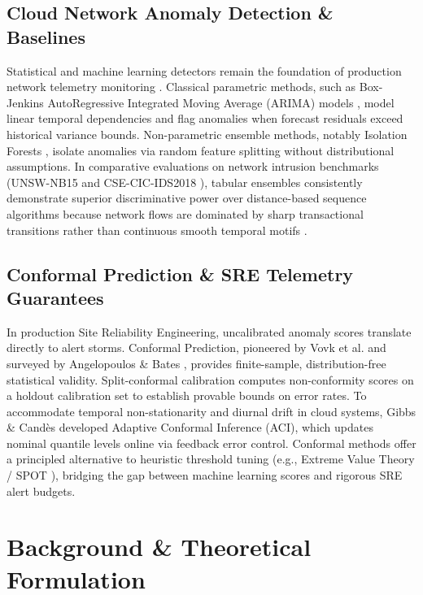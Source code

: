 \documentclass[10pt,twocolumn]{article}
\begin{document}
\subsection{Cloud Network Anomaly Detection \& Baselines}
Statistical and machine learning detectors remain the foundation of production network telemetry monitoring \cite{chandola2009anomaly}. Classical parametric methods, such as Box-Jenkins AutoRegressive Integrated Moving Average (ARIMA) models \cite{box2015time}, model linear temporal dependencies and flag anomalies when forecast residuals exceed historical variance bounds. Non-parametric ensemble methods, notably Isolation Forests \cite{liu2008isolation}, isolate anomalies via random feature splitting without distributional assumptions. In comparative evaluations on network intrusion benchmarks (UNSW-NB15 \cite{moustafa2015unsw} and CSE-CIC-IDS2018 \cite{sharafaldin2018toward}), tabular ensembles consistently demonstrate superior discriminative power over distance-based sequence algorithms because network flows are dominated by sharp transactional transitions rather than continuous smooth temporal motifs \cite{sommer2010outside}.

\subsection{Conformal Prediction \& SRE Telemetry Guarantees}
In production Site Reliability Engineering, uncalibrated anomaly scores translate directly to alert storms. Conformal Prediction, pioneered by Vovk et al. \cite{vovk2005algorithmic} and surveyed by Angelopoulos \& Bates \cite{angelopoulos2023conformal}, provides finite-sample, distribution-free statistical validity. Split-conformal calibration computes non-conformity scores on a holdout calibration set to establish provable bounds on error rates. To accommodate temporal non-stationarity and diurnal drift in cloud systems, Gibbs \& Cand{\`e}s \cite{gibbs2021adaptive} developed Adaptive Conformal Inference (ACI), which updates nominal quantile levels online via feedback error control. Conformal methods offer a principled alternative to heuristic threshold tuning (e.g., Extreme Value Theory / SPOT \cite{siffer2017anomaly}), bridging the gap between machine learning scores and rigorous SRE alert budgets.

\section{Background \& Theoretical Formulation}
\end{document}
